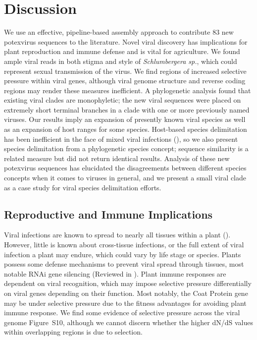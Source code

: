 \documentclass[fleqn,10pt,lineno]{wlpeerj}
\begin{document}
{\section*{Discussion}
We use an effective, pipeline-based assembly approach to contribute 83 new potexvirus sequences to the literature. 
Novel viral discovery has implications for plant reproduction and immune defense and is vital for agriculture.
We found ample viral reads in both stigma and style of \textit{Schlumbergera sp.}, which could represent sexual transmission of the virus.
We find regions of increased selective pressure within viral genes, although viral genome structure and reverse coding regions may render these measures inefficient.
A phylogenetic analysis found that existing viral clades are monophyletic; the new viral sequences were placed on extremely short terminal branches in a clade with one or more previously named viruses.
Our results imply an expansion of presently known viral species as well as an expansion of host ranges for some species.
Host-based species delimitation has been inefficient in the face of mixed viral infections (\citealt{li_viral_2015}), so we also present species delimitation from a phylogenetic species concept; sequence similarity is a related measure but did not return identical results.
Analysis of these new potexvirus sequences has elucidated the disagreements between different species concepts when it comes to viruses in general, and we present a small viral clade as a case study for viral species delimitation efforts.
 
 
\subsection*{Reproductive and Immune Implications}
Viral infections are known to spread to nearly all tissues within a plant (\citealt{Hipper_2013}). 
However, little is known about cross-tissue infections, or the full extent of viral infection a plant may endure, which could vary by life stage or species.
Plants possess some defense mechanisms to prevent viral spread through tissues, most notable RNAi gene silencing (Reviewed in \citealt{Hipper_2013}).
Plant immune responses are dependent on viral recognition, which may impose selective pressure differentially on viral genes depending on their function.
Most notably, the Coat Protein gene may be under selective pressure due to the fitness advantages for avoiding plant immune response. 
We find some evidence of selective pressure across the viral genome {Figure~S10}, although we cannot discern whether the higher dN/dS values within overlapping regions is due to selection.


}
\end{document}
